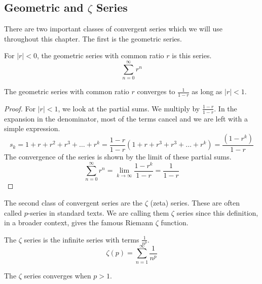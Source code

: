 \documentclass[fleqn,letterpaper]{report}
\begin{document}
\subsection{Geometric and $\zeta$ Series}
\label{geometric-zeta}

There are two important classes of convergent series which we
will use throughout this chapter. The first is the geometric
series. 

\begin{defn}
For $|r|<0$, the geometric series with common ratio $r$ is
this series.
\begin{equation*}
\sum_{n=0}^\infty r^n 
\end{equation*}
\end{defn}

\begin{prop}
The geometric series with common ratio $r$ converges to
$\frac{1}{1-r}$ as long as $|r|<1$.
\end{prop}

\begin{proof}
For $|r| < 1$, we look at the partial sums. We multiply by
$\frac{1-r}{1-r}$. In the expansion in the denominator, most
of the terms cancel and we are left with a simple expression.
\begin{equation*}
s_k = 1 + r + r^2 + r^3 + \ldots + r^k = \frac{1-r}{1-r}
\left( 1 + r + r^3 + r^3 + \ldots + r^k \right) = \frac{(1-r^k)}{1-r}
\end{equation*}
The convergence of the series is shown by the limit of these
partial sums.
\begin{equation*}
\sum_{n=0}^\infty r^n = \lim_{k \rightarrow \infty}
\frac{1-r^k}{1-r} = \frac{1}{1-r}
\end{equation*}
\end{proof}

The second class of convergent series are the $\zeta$ (zeta)
series. These are often called $p$-series in standard
texts. We are calling them $\zeta$ series since this
definition, in a broader context, gives the famous Riemann
$\zeta$ function. 

\begin{defn} The $\zeta$ series is the infinite series with
terms $\frac{1}{n^p}$. 
\begin{equation*}
\zeta(p) = \sum_{n=1}^\infty \frac{1}{n^p} 
\end{equation*} \end{defn}
\begin{prop}
The $\zeta$ series converges when $p > 1$. 
\end{prop} 
\end{document}
